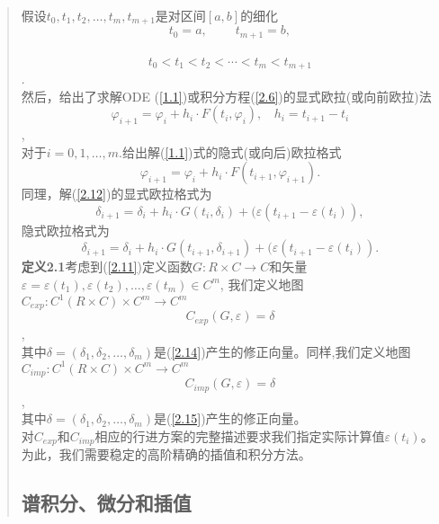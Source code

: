 \documentclass{article}
\begin{document}
\begin{CJK}{UTF8}{gkai}
\begin{quotation}
假设$t_0,t_1,t_2,\ldots,t_m,t_{m+1}$是对区间$[a,b]$的细化\\
$$t_0=a,~~~~~~~~~~t_{m+1}=b,$$\\
$$t_0<t_1<t_2<\cdots<t_m<t_{m+1}$$.\\
然后，给出了求解ODE (\ref{1.1})或积分方程(\ref{2.6})的显式欧拉(或向前欧拉)法\\
$$\varphi_{i+1}=\varphi_i+h_i \cdot F(t_i,\varphi_i),~~~~h_i=t_{i+1}-t_i$$,\\
对于$i = 0,1,\ldots,m$.给出解(\ref{1.1})式的隐式(或向后)欧拉格式\\
\begin{equation}
\varphi_{i+1}=\varphi_i+h_i \cdot F(t_{i+1},\varphi_{i+1}).
\end{equation}
同理，解(\ref{2.12})的显式欧拉格式为\\
\begin{equation}
\label{2.14}
\delta_{i+1}=\delta_i+h_i \cdot G(t_{i},\delta_{i})+(\varepsilon(t_{i+1}-\varepsilon(t_i)),
\end{equation}
隐式欧拉格式为\\
\begin{equation}
\label{2.15}
\delta_{i+1}=\delta_i+h_i \cdot G(t_{i+1},\delta_{i+1})+(\varepsilon(t_{i+1}-\varepsilon(t_i)).
\end{equation}
\textbf{定义2.1}考虑到(\ref{2.11})定义函数$G:R \times C \rightarrow C$和矢量$\varepsilon={\varepsilon(t_1),\varepsilon(t_2),\ldots,\varepsilon(t_m)} \in C^m$, 我们定义地图$C_{exp}:C^1(R \times C) \times C^m \rightarrow C^m$\\
$$C_{exp}(G,\varepsilon)=\delta$$,\\
其中$\delta=(\delta_1,\delta_2,\ldots,\delta_m)$是(\ref{2.14})产生的修正向量。同样,我们定义地图$C_{imp}:C^1(R \times C) \times C^m \rightarrow C^m$\\
$$C_{imp}(G,\varepsilon)=\delta$$,\\
其中$\delta=(\delta_1,\delta_2,\ldots,\delta_m)$是(\ref{2.15})产生的修正向量。\\

对$C_{exp}$和$C_{imp}$相应的行进方案的完整描述要求我们指定实际计算值$\varepsilon(t_i)$。为此，我们需要稳定的高阶精确的插值和积分方法。\\
\subsection{谱积分、微分和插值}


\end{quotation}
\end{CJK}
\end{document}
